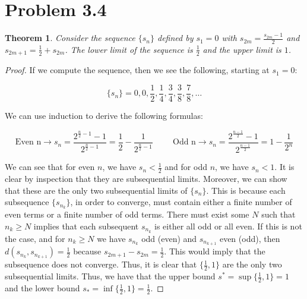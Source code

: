 \documentclass[psamsfonts]{amsart}
\newtheorem{thm}{Theorem}[section]
\theoremstyle{definition}
\theoremstyle{remark}
\numberwithin{equation}{section}
\begin{document}
\section{Problem 3.4}

\begin{thm}
Consider the sequence $\{ s_n \}$ defined by $s_1 = 0$ with $s_{2m} = \frac{s_{2m} - 1}{2}$ and $s_{2m+1} = \frac{1}{2} + s_{2m}$. The lower limit of the sequence is $\frac{1}{2}$ and the upper limit is $1$. 
\end{thm}

\begin{proof}
If we compute the sequence, then we see the following, starting at $s_1 = 0$:

\begin{equation}
\{ s_n \} = 0, 0, \frac{1}{2}, \frac{1}{4}, \frac{3}{4}, \frac{3}{8}, \frac{7}{8}, \ldots
\end{equation}

We can use induction to derive the following formulas:

\begin{equation*}
\text{Even n} \rightarrow s_n = \frac{2^{\frac{n}{2}-1} - 1 }{2^{\frac{n}{2} -1}} = \frac{1}{2} - \frac{1}{2^{\frac{n}{2}-1}} \hspace{1cm} \text{Odd n} \rightarrow s_n = \frac{2^{\frac{n-1}{2}} - 1}{2^{\frac{n-1}{2}}} = 1 - \frac{1}{2^n}
\end{equation*}

We can see that for even $n$, we have $s_n < \frac{1}{2}$ and for odd $n$, we have $s_n < 1$. It is clear by inspection that they are subsequential limits. Moreover, we can show that these are the only two subsequential limits of $\{ s_{n} \}$. This is because each subsequence $\{ s_{n_k} \}$, in order to converge, must contain either a finite number of even terms or a finite number of odd terms. There must exist some $N$ such that $n_k \geq N$ implies that each subsequent $s_{n_k}$ is either all odd or all even. If this is not the case, and for $n_k \geq N$ we have $s_{n_k}$ odd (even) and $s_{n_{k+1}}$ even (odd), then $d(s_{n_k},s_{n_{k+1}}) = \frac{1}{2}$ because $s_{2m+1} - s_{2m} = \frac{1}{2}$. This would imply that the subsequence does not converge. Thus, it is clear that $\{\frac{1}{2},1 \}$ are the only two subsequential limits. Thus, we have that the upper bound $s^{*} = \sup \{ \frac{1}{2}, 1 \} = 1$ and the lower bound $s_{*} = \inf \{ \frac{1}{2},1 \} = \frac{1}{2}$. 

\end{proof}
\end{document}
